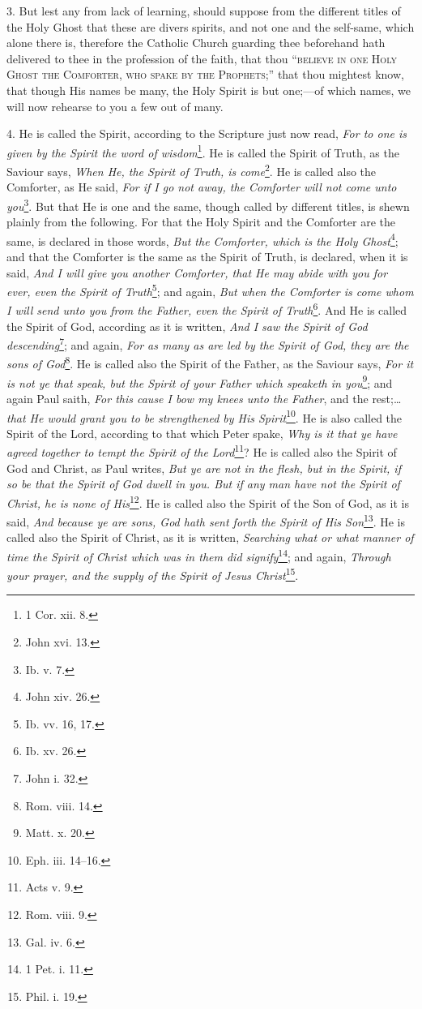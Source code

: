 3. But lest any from lack of learning, should suppose from the different titles of the Holy Ghost that these are divers spirits, and not one and the self-same, which alone there is, therefore the Catholic Church guarding thee beforehand hath delivered to thee in the profession of the faith, that thou “\textsc{believe in one Holy Ghost the Comforter, who spake by the Prophets};” that thou mightest know, that though His names be many, the Holy Spirit is but one;—of which names, we will now rehearse to you a few out of many.

4. He is called the Spirit, according to the Scripture just now read, \emph{For to one is given by the Spirit the word of wisdom}\footnote{1 Cor. xii. 8.}. He is called the Spirit of Truth, as the Saviour says, \emph{When He, the Spirit of Truth, is come}\footnote{John xvi. 13.}. He is called also the Comforter, as He said, \emph{For if I go not away, the Comforter will not come unto you}\footnote{Ib. v. 7.}. But that He is one and the same, though called by different titles, is shewn plainly from the following. For that the Holy Spirit and the Comforter are the same, is declared in those words, \emph{But the Comforter, which is the Holy Ghost}\footnote{John xiv. 26.}; and that the Comforter is the same as the Spirit of Truth, is declared, when it is said, \emph{And I will give you another Comforter, that He may abide with you for ever, even the Spirit of Truth}\footnote{Ib. vv. 16, 17.}; and again, \emph{But when the Comforter is come whom I will send unto you from the Father, even the Spirit of Truth}\footnote{Ib. xv. 26.}. And He is called the Spirit of God, according as it is written, \emph{And I saw the Spirit of God descending}\footnote{John i. 32.}; and again, \emph{For as many as are led by the Spirit of God, they are the sons of God}\footnote{Rom. viii. 14.}. He is called also the Spirit of the Father, as the Saviour says, \emph{For it is not ye that speak, but the Spirit of your Father which speaketh in you}\footnote{Matt. x. 20.}; and again Paul saith, \emph{For this cause I bow my knees unto the Father}, and the rest;…\emph{that He would grant you to be strengthened by His Spirit}\footnote{Eph. iii. 14–16.}. He is also called the Spirit of the Lord, according to that which Peter spake, \emph{Why is it that ye have agreed together to tempt the Spirit of the Lord}\footnote{Acts v. 9.}? He is called also the Spirit of God and Christ, as Paul writes, \emph{But ye are not in the flesh, but in the Spirit, if so be that the Spirit of God dwell in you. But if any man have not the Spirit of Christ, he is none of His}\footnote{Rom. viii. 9.}. He is called also the Spirit of the Son of God, as it is said, \emph{And because ye are sons, God hath sent forth the Spirit of His Son}\footnote{Gal. iv. 6.}. He is called also the Spirit of Christ, as it is written, \emph{Searching what or what manner of time the Spirit of Christ which was in them did signify}\footnote{1 Pet. i. 11.}; and again, \emph{Through your prayer, and the supply of the Spirit of Jesus Christ}\footnote{Phil. i. 19.}.


